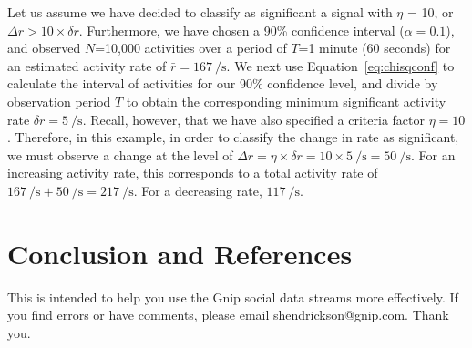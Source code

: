 \documentclass{article}
\begin{document}
%
%


Let us assume we have decided to classify as significant a signal with $\eta$ = 10, or 
$\Delta r > 10\times\delta r$. Furthermore, we have chosen a 90\% confidence interval 
($\alpha = 0.1$), and observed $N$=10,000 activities over a period of $T$=1 minute 
(60 seconds) for an estimated activity rate of $\bar r = 167~\si{\per\second}$. We next use 
Equation~\ref{eq:chisqconf} to calculate the interval of activities for our 
90\% confidence level, and divide by observation period $T$ to obtain the corresponding 
minimum significant activity rate $\delta r = 5~\si{\per\second}$. Recall, however, 
that we have also specified a criteria factor $\eta = 10$. Therefore, in this example, 
in order to classify the change in rate as significant, we must observe a change at the 
level of 
$\Delta r = \eta \times \delta r = 10 \times 5~\si{\per\second} = 50~\si{\per\second}$. 
For an increasing activity rate, this corresponds to a total activity rate of 
$167~\si{\per\second} + 50~\si{\per\second} = 217~\si{\per\second}$. For a decreasing 
rate, $117~\si{\per\second}$.





\section{Conclusion and References} 

This is intended to help you use the Gnip social data streams more effectively.  If you find errors or have comments, please email shendrickson@gnip.com. Thank you.
\end{document}
